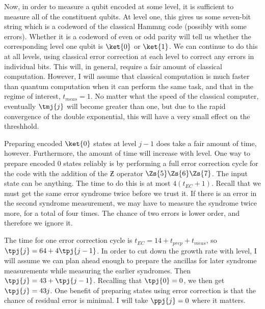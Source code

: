 Now, in order to measure a qubit encoded at some level, it is sufficient to
measure all of the constituent qubits.  At level one, this gives us some
seven-bit string which is a codeword of the classical Hammng code (possibly
with some errors).  Whether it is a codeword of even or odd parity will tell us
whether the corresponding level one qubit is $\ket{0}$ or $\ket{1}$.  We can
continue to do this at all levels, using classical error correction at each
level to correct any errors in individual bits.  This will, in general, require
a fair amount of classical computation.  However, I will assume that classical
computation is much faster than quantum computation when it can
perform the same task, and that in the regime of interest, $t_{meas} = 1$.
No matter what the speed of the classical computer, eventually $\tmj{j}$
will become greater than one, but due to the rapid convergence of the double
exponential, this will have a very small effect on the threshhold.

Preparing encoded $\ket{0}$ states at level $j-1$ does take a fair amount
of time, however.  Furthermore, the amount of time will increase with
level.  One way to prepare encoded $0$ states reliably is by performing a
full error correction cycle for the code with the addition of the $\Zbar$
operator $\Zs{5} \Zs{6} \Zs{7}$.  The input state can be anything.  The time to
do this is at most $4(t_{EC} + 1)$.  Recall that we must get the same error
syndrome twice before we trust it.  If there is an error in the second
syndrome measurement, we may have to measure the syndrome twice
more, for a total of four times.  The chance of two errors is lower order,
and therefore we ignore it.

The time for one error correction cycle is $t_{EC} = 14 + t_{prep} +
t_{meas}$, so $\tpj{j} = 64 + 4 \tpj{j-1}$.  In order to cut down the growth
rate with level, I will assume we can plan ahead enough to prepare the
ancillas for later syndrome measurements while measuring the earlier
syndromes.  Then $\tpj{j} = 43 + \tpj{j-1}$.  Recalling that $\tpj{0} = 0$, we
then get $\tpj{j} = 43 j$.  One benefit of preparing states using error
correction is that the chance of residual error is minimal.  I will take
$\ppj{j} = 0$ where it matters.

